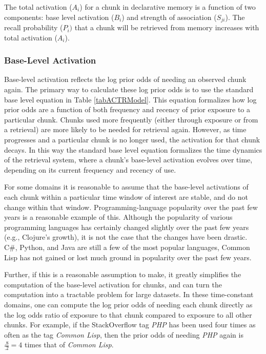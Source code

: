 \documentclass[man,floatsintext,donotrepeattitle]{apa6}
\begin{document}
The total activation ($A_{i}$) for a chunk in declarative memory is a function of two components: base level activation ($B_{i}$) and strength of association ($S_{ji}$).
The recall probability ($P_{i})$ that a chunk will be retrieved from memory increases with total activation ($A_{i}$).

\subsubsection{Base-Level Activation}

Base-level activation reflects the log prior odds of needing an observed chunk again.
The primary way to calculate these log prior odds is to use the standard base level equation in Table \ref{tabACTRModel}.
This equation formalizes how log prior odds are a function of both frequency and recency of prior exposure to a particular chunk.
Chunks used more frequently (either through exposure or from a retrieval) are more likely to be needed for retrieval again.
However, as time progresses and a particular chunk is no longer used, the activation for that chunk decays.
In this way the standard base level equation formalizes the time dynamics of the retrieval system, where a chunk's base-level activation evolves over time, depending on its current frequency and recency of use.

For some domains it is reasonable to assume that the base-level activations of each chunk within a particular time window of interest are stable, and do not change within that window.
Programming-language popularity over the past few years is a reasonable example of this.
Although the popularity of various programming languages has certainly changed slightly over the past few years (e.g., Clojure's growth), it is not the case that the changes have been drastic.
C\#, Python, and Java are still a few of the most popular languages, Common Lisp has not gained or lost much ground in popularity over the past few years.

Further, if this is a reasonable assumption to make, it greatly simplifies the computation of the base-level activation for chunks, and can turn the computation into a tractable problem for large datasets.
In these time-constant domains, one can compute the log prior odds of needing each chunk directly as the log odds ratio of exposure to that chunk compared to exposure to all other chunks.
For example, if the StackOverflow tag \emph{PHP} has been used four times as often as the tag \emph{Common Lisp}, then the prior odds of needing \emph{PHP} again is $\frac{.8}{.2}=4$ times that of \emph{Common Lisp}.
\end{document}
